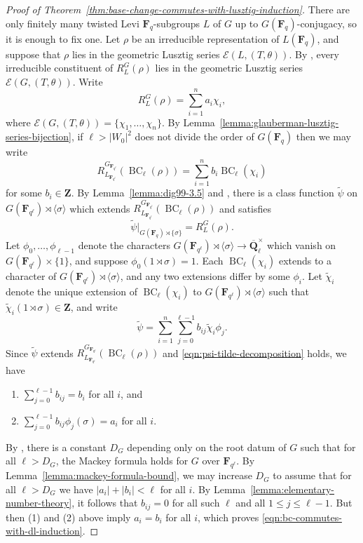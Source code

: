 \documentclass[11pt,reqno]{amsart}
\theoremstyle{definition}
\newcommand{\F}{{\mathbf F}}
\newcommand{\Q}{{\mathbf Q}}
\newcommand{\Z}{{\mathbf Z}}
\newcommand{\cE}{\mathcal{E}}
\DeclareMathOperator{\BC}{BC}
\newcommand{\ol}[1]{\overline{#1}}
\begin{document}
\begin{proof}[Proof of Theorem~\ref{thm:base-change-commutes-with-lusztig-induction}]
    There are only finitely many twisted Levi $\F_q$-subgroups $L$ of $G$ up to $G(\F_q)$-conjugacy, so it is enough to fix one. Let $\rho$ be an irreducible representation of $L(\F_q)$, and suppose that $\rho$ lies in the geometric Lusztig series $\cE(L, (T,\theta))$. By \cite[Th\'eor\`eme 11.10]{Bon06}, every irreducible constituent of $R_L^G(\rho)$ lies in the geometric Lusztig series $\cE(G, (T, \theta))$. Write 
    \[
    R_L^G(\rho) = \sum_{i=1}^n a_i\chi_i,
    \]
    where $\cE(G, (T,\theta)) = \{\chi_1, \dots, \chi_n\}$. By Lemma~\ref{lemma:glauberman-lusztig-series-bijection}, if $\ell > |W_0|^2$ does not divide the order of $G(\F_q)$ then we may write
    \[
    R_{L_{\F_{q^\ell}}}^{G_{\F_{q^\ell}}}(\BC_\ell(\rho)) = \sum_{i=1}^n b_i\BC_\ell(\chi_i)
    \]
    for some $b_i \in \Z$. By Lemma~\ref{lemma:dig99-3.5} and \cite[Proposition 3.1]{Dig99}, there is a class function $\widetilde\psi$ on $G(\F_{q^\ell}) \rtimes \langle\sigma\rangle$ which extends $R_{L_{\F_{q^\ell}}}^{G_{\F_{q^\ell}}}(\BC_\ell(\rho))$ and satisfies
    \begin{equation}\label{eqn:psi-tilde-shear-restriction}
        \widetilde\psi|_{G(\F_q) \rtimes \{\sigma\}} = R_L^G(\rho).
    \end{equation}
    Let $\phi_0, \dots, \phi_{\ell-1}$ denote the characters $G(\F_{q^\ell}) \rtimes \langle\sigma\rangle \to \ol\Q_\ell^\times$ which vanish on $G(\F_{q^\ell}) \times \{1\}$, and suppose $\phi_0(1 \rtimes \sigma) = 1$. Each $\BC_\ell(\chi_i)$ extends to a character of $G(\F_{q^\ell}) \rtimes \langle\sigma\rangle$, and any two extensions differ by some $\phi_i$. Let $\widetilde\chi_i$ denote the unique extension of $\BC_\ell(\chi_i)$ to $G(\F_{q^\ell}) \rtimes \langle\sigma\rangle$ such that $\widetilde\chi_i(1 \rtimes \sigma) \in \Z$, and write
    \begin{equation}\label{eqn:psi-tilde-decomposition}
        \widetilde\psi = \sum_{i=1}^n \sum_{j=0}^{\ell-1} b_{ij} \widetilde{\chi}_i\phi_j.
    \end{equation}
    Since $\widetilde\psi$ extends $R_{L_{\F_{q^\ell}}}^{G_{\F_{q^\ell}}}(\BC_\ell(\rho))$ and \eqref{eqn:psi-tilde-decomposition} holds, we have
    \begin{enumerate}
        \item $\sum_{j=0}^{\ell-1} b_{ij} = b_i$ for all $i$, and
        \item $\sum_{j=0}^{\ell-1} b_{ij}\phi_j(\sigma) = a_i$ for all $i$.
    \end{enumerate}
    By \cite[Th\'eor\`eme 5.1.1]{Bon98}, there is a constant $D_G$ depending only on the root datum of $G$ such that for all $\ell > D_G$, the Mackey formula holds for $G$ over $\F_{q^\ell}$. By Lemma~\ref{lemma:mackey-formula-bound}, we may increase $D_G$ to assume that for all $\ell > D_G$ we have $|a_i| + |b_i| < \ell$ for all $i$. By Lemma~\ref{lemma:elementary-number-theory}, it follows that $b_{ij} = 0$ for all such $\ell$ and all $1 \leq j \leq \ell-1$. But then (1) and (2) above imply $a_i = b_i$ for all $i$, which proves \eqref{eqn:bc-commutes-with-dl-induction}.


\end{proof}
\end{document}
